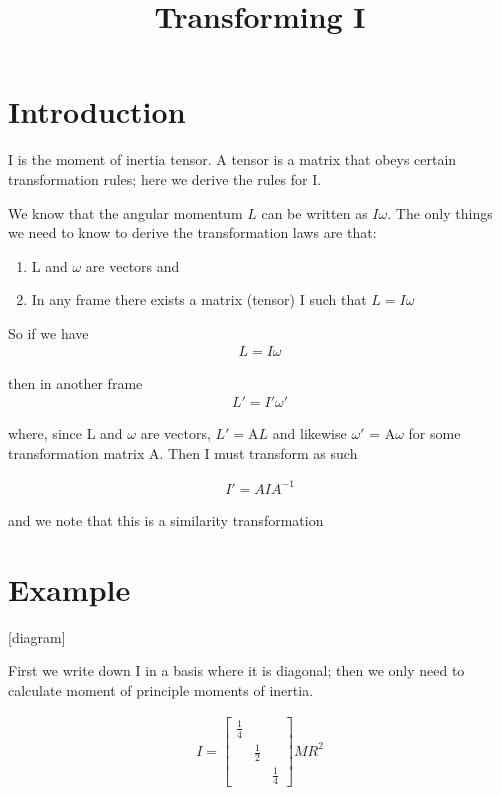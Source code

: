 \documentclass{article}
\title{Transforming I}
\date{}
\begin{document}
\maketitle

\section{Introduction}

I is the moment of inertia tensor. A tensor is a matrix that obeys certain transformation rules; here we derive the rules for I.

We know that the angular momentum $L$ can be written as $I\omega$. The only things we need to know to derive the transformation laws are that:

\begin{enumerate}
\item{L and $\omega$ are vectors and}
\item{In any frame there exists a matrix (tensor) I such that $L = I\omega$}
\end{enumerate}

So if we have
\begin{align}
L = I\omega
\end{align}

then in another frame
\begin{align}
L' = I'\omega'
\end{align}

where, since L and $\omega$ are vectors,
$L' = $A$L$ and likewise $\omega'$ = A$\omega$ for some transformation matrix A. Then I must transform as such

\begin{align}
I' = AIA^{-1}
\end{align}

and we note that this is a similarity transformation

\section{Example}

[diagram]

First we write down I in a basis where it is diagonal; then we only need to calculate moment of principle moments of inertia.

\begin{align}
I
=
\begin{bmatrix} \frac{1}{4} &  & \\  & \frac{1}{2} &  \\  &  & \frac{1}{4}  \end{bmatrix} MR^{2}
\end{align}
\end{document}
